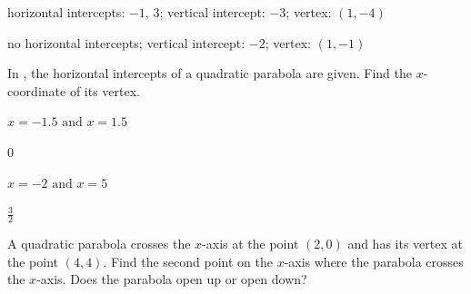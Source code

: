 \begin{solution}
     horizontal intercepts: $-1$, $3$; vertical intercept: $-3$; vertex: $(1,-4)$
\end{solution}






\begin{exercise}\label{exercise-3.1.6}
\begin{center}
\end{center}
\end{exercise}

\begin{solution}
    no horizontal intercepts; vertical intercept: $-2$; vertex: $(1,-1)$
\end{solution}









\noindent In , the horizontal intercepts of a quadratic parabola are given. Find the $x$-coordinate of its vertex.



\begin{exercise}\label{exercise-3.1.7}$\displaystyle x=-1.5 \mbox{ and } x=1.5$
\end{exercise}

\begin{solution}
    $0$
\end{solution}





\begin{exercise}\label{exercise-3.1.8}$\displaystyle x=-2 \mbox{ and } x=5$
\end{exercise}

\begin{solution}
    $\frac{3}{2}$
\end{solution}





\begin{exercise} A quadratic parabola crosses the $x$-axis at the point $(2,0)$ and has its vertex at the point $(4,4)$. Find the second point on the $x$-axis where the parabola crosses the $x$-axis. Does the parabola open up or open down?
\end{exercise}

